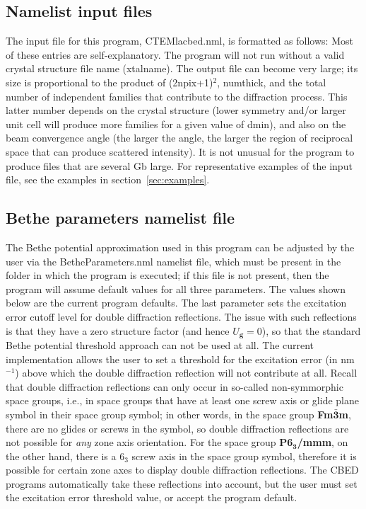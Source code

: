 \documentclass[DIV=calc, paper=letter, fontsize=11pt]{scrartcl}	 %
\begin{document}
\subsection{Namelist input files\label{sec:f90inputlacbed}}
The input file for this program, \textsf{CTEMlacbed.nml}, is formatted as follows:
Most of these entries are self-explanatory.  The program will not run
without a valid crystal structure file name (xtalname).  The output
file can become very large; its size is proportional to the product 
of (2npix+1)$^2$, numthick, and the total number of independent families
that contribute to the diffraction process. This latter number depends 
on the crystal structure (lower symmetry and/or larger unit cell will produce 
more families for a given value of dmin), and also on the beam 
convergence angle (the larger the angle, the larger the region of reciprocal 
space that can produce scattered intensity).  It is not unusual for the 
program to produce files that are several Gb large.  For representative 
examples of the input file, see the examples in section~\ref{sec:examples}.

\subsection{Bethe parameters namelist file\label{sec:f90BetheParameters}}
The Bethe potential approximation used in this program can be adjusted by the
user via the \textsf{BetheParameters.nml} namelist file, which must be present 
in the folder in which the program is executed; if this file is not present, then the
program will assume default values for all three parameters.  The values shown below
are the current program defaults.
The last parameter sets the excitation error cutoff level for double diffraction reflections.  The issue with
such reflections is that they have a zero structure factor (and hence $U_{\mathbf{g}} = 0$), so that 
the standard Bethe potential threshold approach can not be used at all.  The current implementation
allows the user to set a threshold for the excitation error (in nm$^{-1}$) above which the double diffraction reflection
will not contribute at all.  Recall that double diffraction reflections can only occur in so-called non-symmorphic 
space groups, i.e., in space groups that have at least one screw axis or glide plane symbol in their space 
group symbol; in other words, in the space group \textbf{Fm$\bar{\mathbf{3}}$m}, there are no glides or screws in
the symbol, so double diffraction reflections are not possible for \textit{any} zone axis orientation.  For the space group \textbf{P6$_{\mathbf{3}}$/mmm},
on the other hand, there is a $6_3$ screw axis in the space group symbol, therefore it is possible for certain
zone axes to display double diffraction reflections.  The CBED programs automatically take these reflections into account, but the user must
set the excitation error threshold value, or accept the program default.
\end{document}
